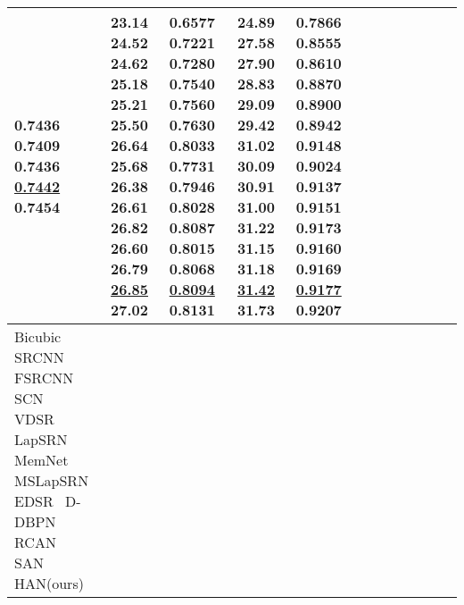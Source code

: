 \documentclass[runningheads]{llncs}
\begin{document}
\begin{table}[!ht]
\begin{tabular}{|p{7em}|p{2.5em}|p{2.5em}|p{3em}|p{2.5em}|p{3em}|p{2.5em}|p{3em}|p{2.5em}|p{3em}|p{2.5em}|p{3em}|}
{}0.7436 \newline{}0.7409 \newline{}0.7436 \newline{}\underline{0.7442} \newline{}\bfseries{0.7454} & 23.14 \newline{}24.52 \newline{}24.62 \newline{}25.18 \newline{}25.21 \newline{}25.50 \newline{}26.64 \newline{}25.68 \newline{}26.38 \newline{}26.61 \newline{}26.82 \newline{}26.60 \newline{}26.79 \newline{}\underline{26.85} \newline{}\bfseries{27.02} & 0.6577 \newline{}0.7221 \newline{}0.7280 \newline{}0.7540 \newline{}0.7560 \newline{}0.7630 \newline{}0.8033 \newline{}0.7731 \newline{}0.7946 \newline{}0.8028 \newline{}0.8087 \newline{}0.8015 \newline{}0.8068 \newline{}\underline{0.8094} \newline{}\bfseries{0.8131} & 24.89 \newline{}27.58 \newline{}27.90 \newline{}28.83 \newline{}29.09 \newline{}29.42 \newline{}31.02 \newline{}30.09 \newline{}30.91 \newline{}31.00 \newline{}31.22 \newline{}31.15 \newline{}31.18 \newline{}\underline{31.42} \newline{}\bfseries{31.73} & 0.7866\newline{} 0.8555\newline{} 0.8610\newline{} 0.8870\newline{} 0.8900\newline{} 0.8942\newline{} 0.9148\newline{} 0.9024\newline{} 0.9137\newline{} 0.9151\newline{} 0.9173 \newline{}0.9160 \newline{}0.9169 \newline{}\underline{0.9177} \newline{}\bfseries{0.9207} \\
		\hline
		\hline
		Bicubic \newline{}SRCNN~\cite{dong2014learning} \newline{} FSRCNN~\cite{dong2016accelerating} \newline{} SCN~\cite{wang2015deep} \newline{} VDSR~\cite{kim2016accurate} \newline{} LapSRN~\cite{lai2017deep} \newline{} MemNet~\cite{tai2017memnet} \newline{} MSLapSRN\cite{lai2017deep} \newline{} EDSR~\cite{lim2017enhanced} \newline{}  D-DBPN~\cite{haris2018deep} \newline{}  RCAN~\cite{zhang2018image} \newline{}  SAN~\cite{dai2019second} \newline{} HAN(ours) \n
\end{tabular}
\end{table}
\end{document}
